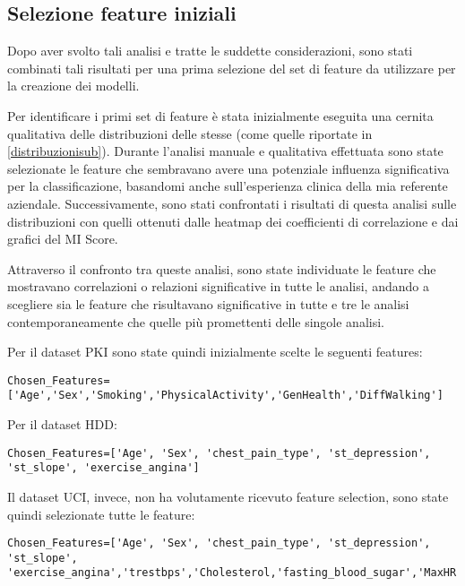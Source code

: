 \subsection{Selezione feature iniziali}
\begin{flushleft}
    
Dopo aver svolto tali analisi e tratte le suddette considerazioni, sono stati combinati tali risultati per una prima selezione del set di feature da utilizzare per la creazione dei modelli.

Per identificare i primi set di feature  è stata inizialmente eseguita una cernita qualitativa delle distribuzioni delle stesse (come quelle riportate in \ref{distribuzionisub}).
Durante l'analisi manuale e qualitativa effettuata sono state selezionate le feature che sembravano avere una potenziale influenza significativa per la classificazione, basandomi anche sull'esperienza clinica della mia referente aziendale. Successivamente, sono stati confrontati i risultati di questa analisi sulle distribuzioni con quelli ottenuti dalle heatmap dei coefficienti di correlazione e dai grafici del MI Score.

Attraverso il confronto tra queste analisi, sono state individuate le feature che mostravano correlazioni o relazioni significative in tutte le analisi, andando a scegliere sia le feature che risultavano significative in tutte e tre le analisi contemporaneamente che quelle più promettenti delle singole analisi.  

Per il dataset PKI sono state quindi inizialmente scelte le seguenti features:

 \begin{lstlisting}
Chosen_Features=['Age','Sex','Smoking','PhysicalActivity','GenHealth','DiffWalking']
\end{lstlisting}

Per il dataset HDD:
\begin{lstlisting}
Chosen_Features=['Age', 'Sex', 'chest_pain_type', 'st_depression', 'st_slope', 'exercise_angina']
\end{lstlisting}


Il dataset UCI, invece, non ha volutamente ricevuto feature selection, sono state quindi selezionate tutte le feature:

\begin{lstlisting}
Chosen_Features=['Age', 'Sex', 'chest_pain_type', 'st_depression', 'st_slope', 'exercise_angina','trestbps','Cholesterol,'fasting_blood_sugar','MaxHR','exercise_angina','vessel_fluoroscopy']
\end{lstlisting}
		
\end{flushleft}


